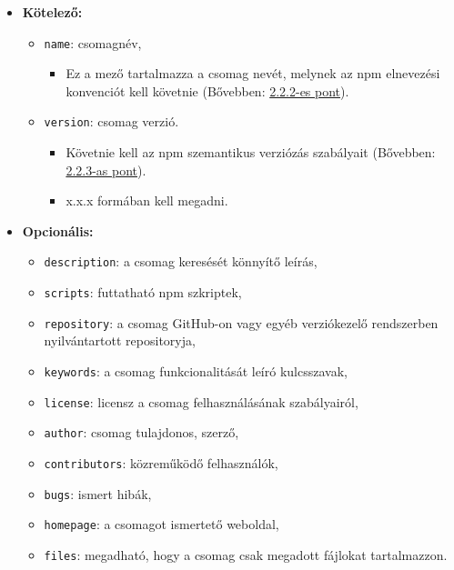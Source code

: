 	\begin{itemize}
		\item \textbf{Kötelező:}
		\begin{itemize}
			\item \texttt{name}: csomagnév,
			\begin{itemize}
				\item Ez a mező tartalmazza a csomag nevét, melynek az npm elnevezési konvenciót kell követnie (Bővebben: \hyperlink{subsection.2.2.2}{2.2.2-es pont}).
			\end{itemize}
			\item \texttt{version}: csomag verzió.
			\begin{itemize}
				\item Követnie kell az npm szemantikus verziózás szabályait (Bővebben: \hyperlink{subsection.2.2.3}{2.2.3-as pont}).
				\item x.x.x formában kell megadni.
			\end{itemize}
		\end{itemize}
		\item \textbf{Opcionális:}
		\begin{itemize}
			\item \texttt{description}: a csomag keresését könnyítő leírás,	
			\item \texttt{scripts}: futtatható npm szkriptek,
			\item \texttt{repository}: a csomag GitHub-on vagy egyéb verziókezelő rendszerben nyilvántartott repositoryja,
			\item \texttt{keywords}: a csomag funkcionalitását leíró kulcsszavak,
			\item \texttt{license}: licensz a csomag felhasználásának szabályairól,
			\item \texttt{author}: csomag tulajdonos, szerző,
			\item \texttt{contributors}: közreműködő felhasználók,
			\item \texttt{bugs}: ismert hibák,
			\item \texttt{homepage}: a csomagot ismertető weboldal,
			\item \texttt{files}: megadható, hogy a csomag csak megadott fájlokat tartalmazzon.
			
			\clearpage
			

\end{itemize}
\end{itemize}
